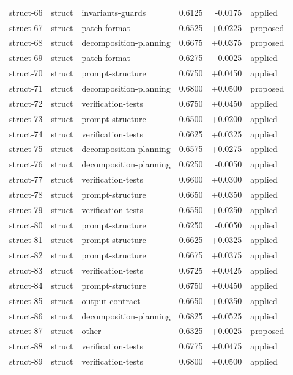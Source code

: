 \begin{center}
\begin{longtable}{llp{5.2cm}rrl}
struct-66 & struct & invariants-guards & 0.6125 & -0.0175 & applied \\
struct-67 & struct & patch-format & 0.6525 & +0.0225 & proposed \\
struct-68 & struct & decomposition-planning & 0.6675 & +0.0375 & proposed \\
struct-69 & struct & patch-format & 0.6275 & -0.0025 & applied \\
struct-70 & struct & prompt-structure & 0.6750 & +0.0450 & applied \\
struct-71 & struct & decomposition-planning & 0.6800 & +0.0500 & proposed \\
struct-72 & struct & verification-tests & 0.6750 & +0.0450 & applied \\
struct-73 & struct & prompt-structure & 0.6500 & +0.0200 & applied \\
struct-74 & struct & verification-tests & 0.6625 & +0.0325 & applied \\
struct-75 & struct & decomposition-planning & 0.6575 & +0.0275 & applied \\
struct-76 & struct & decomposition-planning & 0.6250 & -0.0050 & applied \\
struct-77 & struct & verification-tests & 0.6600 & +0.0300 & applied \\
struct-78 & struct & prompt-structure & 0.6650 & +0.0350 & applied \\
struct-79 & struct & verification-tests & 0.6550 & +0.0250 & applied \\
struct-80 & struct & prompt-structure & 0.6250 & -0.0050 & applied \\
struct-81 & struct & prompt-structure & 0.6625 & +0.0325 & applied \\
struct-82 & struct & prompt-structure & 0.6675 & +0.0375 & applied \\
struct-83 & struct & verification-tests & 0.6725 & +0.0425 & applied \\
struct-84 & struct & prompt-structure & 0.6750 & +0.0450 & applied \\
struct-85 & struct & output-contract & 0.6650 & +0.0350 & applied \\
struct-86 & struct & decomposition-planning & 0.6825 & +0.0525 & applied \\
struct-87 & struct & other & 0.6325 & +0.0025 & proposed \\
struct-88 & struct & verification-tests & 0.6775 & +0.0475 & applied \\
struct-89 & struct & verification-tests & 0.6800 & +0.0500 & applied \\

\end{longtable}
\end{center}
